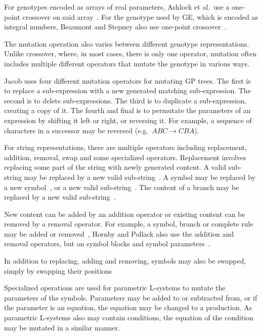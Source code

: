 For genotypes encoded as arrays of real parameters, Ashlock et al.\ use a one-point crossover on said array~\cite{2006Ashlock}.
For the genotype used by \gls{GE}, which is encoded as integral numbers, Beaumont and Stepney also use one-point crossover~\cite{2009Beaumont}.

The mutation operation also varies between different genotype representations.
Unlike crossover, where, in most cases, there is only one operator, mutation often includes multiple different operators that mutate the genotype in various ways.

Jacob uses four different mutation operators for mutating \gls{GP} trees.
The first is to replace a sub-expression with a new generated matching sub-expression.
The second is to delete sub-expressions.
The third is to duplicate a sub-expression, creating a copy of it.
The fourth and final is to permutate the parameters of an expression by shifting it left or right, or reversing it.
For example, a sequence of characters in a successor may be reversed (e.g.\ $ABC \rightarrow CBA$).~\cite{1994Jacob, 1995Jacob}

For string representations, there are multiple operators including replacement, addition, removal, swap and some specialized operators.
Replacement involves replacing some part of the string with newly generated content.
A valid sub-string may be replaced by a new valid sub-string~\cite{1998Mock, 2009Corchado}.
A symbol may be replaced by a new symbol~\cite{2001Hornby, 2002Ebner, 2003Ebner, 2009Corchado, 2013Ding}, or a new valid sub-string~\cite{1998Ochoa}.
The content of a branch may be replaced by a new valid sub-string~\cite{1998Ochoa}.

New content can be added by an addition operator or existing content can be removed by a removal operator.
For example, a symbol, branch or complete rule may be added or removed~\cite{2002Ebner, 2003Ebner},
Hornby and Pollack also use the addition and removal operators, but on symbol blocks and symbol parameters~\cite{2001Hornby}.

In addition to replacing, adding and removing, symbols may also be swapped, simply by swapping their positions~\cite{2002Ebner, 2003Ebner}

Specialized operations are used for parametric \glspl{L-system} to mutate the parameters of the symbols.
Parameters may be added to or subtracted from, or if the parameter is an equation, the equation may be changed to a production.
As parametric \glspl{L-system} also may contain conditions, the equation of the condition may be mutated in a similar manner.~\cite{2001Hornby}

